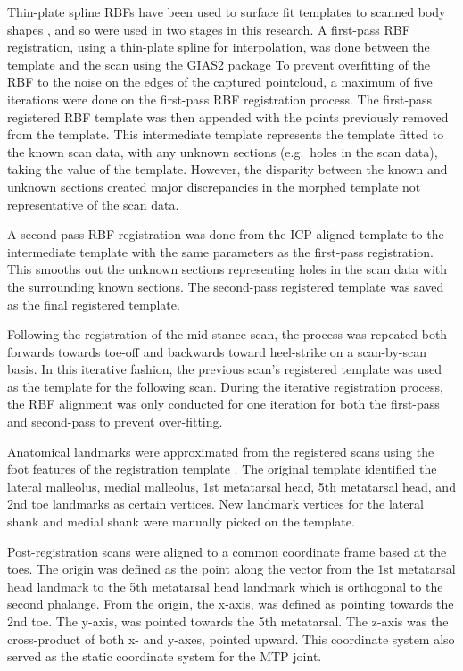 \documentclass[defaultstyle,11pt]{thesis}
\begin{document}
Thin-plate spline RBFs have been used to surface fit templates to scanned body shapes \citep{Park2015a}, and so were used in two stages in this research.
A first-pass RBF registration, using a thin-plate spline for interpolation, was done between the template and the scan using the GIAS2 package \citep{Zhang2016}
To prevent overfitting of the RBF to the noise on the edges of the captured pointcloud, a maximum of five iterations were done on the first-pass RBF registration process.
The first-pass registered RBF template was then appended with the points previously removed from the template.
This intermediate template represents the template fitted to the known scan data, with any unknown sections (e.g.~holes in the scan data), taking the value of the template.
However, the disparity between the known and unknown sections created major discrepancies in the morphed template not representative of the scan data.

A second-pass RBF registration was done from the ICP-aligned template to the intermediate template with the same parameters as the first-pass registration.
This smooths out the unknown sections representing holes in the scan data with the surrounding known sections.
The second-pass registered template was saved as the final registered template.

Following the registration of the mid-stance scan, the process was repeated both forwards towards toe-off and backwards toward heel-strike on a scan-by-scan basis.
In this iterative fashion, the previous scan's registered template was used as the template for the following scan.
During the iterative registration process, the RBF alignment was only conducted for one iteration for both the first-pass and second-pass to prevent over-fitting.

Anatomical landmarks were approximated from the registered scans using the foot features of the registration template \citep{VandenHerrewegen2014b}.
The original template identified the lateral malleolus, medial malleolus, 1st metatarsal head, 5th metatarsal head, and 2nd toe landmarks as certain vertices.
New landmark vertices for the lateral shank and medial shank were manually picked on the template.

Post-registration scans were aligned to a common coordinate frame based at the toes.
The origin was defined as the point along the vector from the 1st metatarsal head landmark to the 5th metatarsal head landmark which is orthogonal to the second phalange.
From the origin, the x-axis, was defined as pointing towards the 2nd toe.
The y-axis, was pointed towards the 5th metatarsal. The z-axis was the cross-product of both x- and y-axes, pointed upward.
This coordinate system also served as the static coordinate system for the MTP joint.
\end{document}
